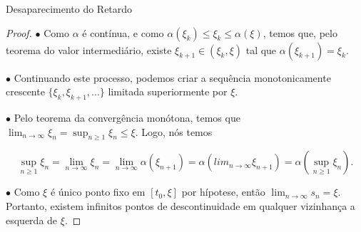 \documentclass{beamer}
\theoremstyle{plain}
\theoremstyle{definition}
\begin{document}
\begin{frame}{Desaparecimento do Retardo}

    \footnotesize
    \begin{proof}
        $\bullet$ Como $\alpha$ é contínua, e como $\alpha(\xi_k) \leq \xi_k \leq  \alpha(\xi)$, temos que, pelo teorema do valor intermediário, existe $\xi_{k+1} \in (\xi_k, \xi)$ tal que $\alpha(\xi_{k+1}) = \xi_k$. 

        $\bullet$ Continuando este processo, podemos criar a sequência monotonicamente crescente $\{\xi_k, \xi_{k+1}, ...\}$ limitada superiormente por $\xi$. 


        $\bullet$ Pelo teorema da convergência monótona, temos que $\lim_{n \to \infty} \xi_n = \sup_{n \geq 1} \xi_n \leq \xi$. Logo, nós temos

        \noindent
        \[
            \sup_{n \geq 1} \xi_n = \lim_{n \to \infty} \xi_n  = 
            \lim_{n \to \infty} \alpha(\xi_{n+1}) = 
            \alpha(lim_{n \to \infty} \xi_{n+1}) = 
            \alpha\left(\sup_{n \geq 1} \xi_n \right).
        \]

        $\bullet$ Como $\xi$ é único ponto fixo em $[t_0, \xi]$ por hípotese, então $\lim_{n \to \infty} s_n = \xi$. Portanto, existem infinitos pontos de descontinuidade em qualquer vizinhança a esquerda de $\xi$.



    \end{proof}
\end{frame}

\end{document}
